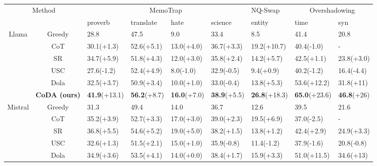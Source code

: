 \begin{table*}[t]
\tabcolsep=0.26cm
\small
\centering
\begin{tabular}{cclllllll}
\toprule
\multicolumn{2}{c}{\multirow{2}{*}{Method}} & \multicolumn{4}{c}{MemoTrap} & NQ-Swap & \multicolumn{2}{c}{Overshadowing} \\ \cmidrule(lr){3-6}  \cmidrule(lr){7-7} \cmidrule(lr){8-9}
\multicolumn{2}{c}{} & proverb & translate & hate & science & entity & time & syn \\
\midrule
\multirow{6}{*}{Llama} & Greedy & 28.8 & 47.5 & 9.0 & 33.4 & 8.5 & 41.4 & 20.8 \\
 & CoT & 30.1\tiny{(+1.3)} & 52.6\tiny{(+5.1)} & 13.0\tiny{(+4.0)} & 36.7\tiny{(+3.3)} & 19.2\tiny{(+10.7)} & 40.4\tiny{(-1.0)} & - \\
 & SR & 34.7\tiny{(+5.9)} & 51.8\tiny{(+4.3)} & 12.0\tiny{(+3.0)} & 35.8\tiny{(+2.4)} & 14.2\tiny{(+5.7)} & 42.5\tiny{(+1.1)} & 23.8\tiny{(+3.0)} \\ 
 & USC & 27.6\tiny{(-1.2)} & 52.4\tiny{(+4.9)} & 8.0\tiny{(-1.0)} & 32.9\tiny{(-0.5)} & 9.4\tiny{(+0.9)} & 40.2\tiny{(-1.2)} & 16.4\tiny{(-4.4)} \\
 & Dola & 32.5\tiny{(+3.7)} & 50.9\tiny{(+3.4)} & 10.0\tiny{(+1.0)} & 33.0\tiny{(-0.4)} & 13.8\tiny{(+5.3)} & 53.6\tiny{(+12.2)} & 31.8\tiny{(+11)} \\
 & \textbf{CoDA (ours)} & \textbf{41.9}\tiny{(+13.1)} & \textbf{56.2}\tiny{(+8.7)} & \textbf{16.0}\tiny{(+7.0)} & \textbf{38.9}\tiny{(+5.5)} & \textbf{26.8}\tiny{(+18.3)} & \textbf{65.0}\tiny{(+23.6)} & \textbf{46.8}\tiny{(+26)} \\
 \midrule
\multirow{6}{*}{Mistral} & Greedy & 31.3 & 49.4 & 14.0 & 36.7 & 12.6 & 39.5 & 21.6 \\
 & CoT & 35.2\tiny{(+3.9)} & 52.7\tiny{(+3.3)} & 17.0\tiny{(+3.0)} & 39.0\tiny{(+2.3)} & 19.5\tiny{(+6.9)} & 37.0\tiny{(-2.5)} & - \\
 & SR & 36.8\tiny{(+5.5)} & 54.6\tiny{(+5.2)} & 19.0\tiny{(+5.0)} & 38.2\tiny{(+1.5)} & 13.8\tiny{(+1.2)} & 42.4\tiny{(+2.9)} & 24.9\tiny{(+3.3)} \\ 
 & USC & 32.6\tiny{(+1.3)} & 51.5\tiny{(+2.1)} & 15.0\tiny{(+1.0)} & 35.9\tiny{(-0.8)} & 11.4\tiny{(-1.2)} & 37.9\tiny{(-1.6)} & 20.8\tiny{(-0.8)} \\
 & Dola & 34.9\tiny{(+3.6)} & 53.5\tiny{(+4.1)} & 14.0\tiny{(+0.0)} & 38.4\tiny{(+1.7)} & 15.9\tiny{(+3.3)} & 51.0\tiny{(+11.5)} & 34.6\tiny{(+13)} \\

\end{tabular}
\end{table*}
